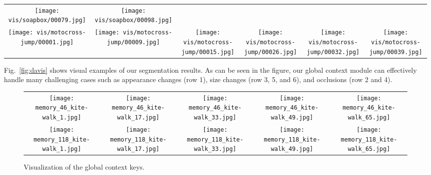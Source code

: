 \documentclass[runningheads]{llncs}
\begin{document}
\begin{figure*}[tb]
\begin{tabular}{cccccc}
        \texttt{[image: vis/soapbox/00079.jpg]} &
        \texttt{[image: vis/soapbox/00098.jpg]} \\
        \texttt{[image: vis/motocross-jump/00001.jpg]} &
        \texttt{[image: vis/motocross-jump/00009.jpg]} &
        \texttt{[image: vis/motocross-jump/00015.jpg]} &
        \texttt{[image: vis/motocross-jump/00026.jpg]} &
        \texttt{[image: vis/motocross-jump/00032.jpg]} &
        \texttt{[image: vis/motocross-jump/00039.jpg]}
    \end{tabular}
    \caption{The visual results of video object segmentation using our global context module.}
    \label{fig:davis}
\end{figure*}

Fig.~\ref{fig:davis} shows visual examples of our segmentation results. As can be seen in the figure, our global context module can effectively handle many challenging cases such as appearance changes (row 1), size changes (row 3, 5, and 6), and occlusions (row 2 and 4).

\begin{figure}[tb]
    \centering
    \setlength{\tabcolsep}{1 pt}
    \begin{tabular}{ccccc}
        \texttt{[image: memory\_46\_kite-walk\_1.jpg]} &
        \texttt{[image: memory\_46\_kite-walk\_17.jpg]} &
        \texttt{[image: memory\_46\_kite-walk\_33.jpg]} &
        \texttt{[image: memory\_46\_kite-walk\_49.jpg]} &
        \texttt{[image: memory\_46\_kite-walk\_65.jpg]} \\
        \texttt{[image: memory\_118\_kite-walk\_1.jpg]} &
        \texttt{[image: memory\_118\_kite-walk\_17.jpg]} &
        \texttt{[image: memory\_118\_kite-walk\_33.jpg]} &
        \texttt{[image: memory\_118\_kite-walk\_49.jpg]} &
        \texttt{[image: memory\_118\_kite-walk\_65.jpg]} \\
    \end{tabular}
    \caption{Visualization of the global context keys.}
    \label{fig:vis}
\end{figure}
\end{document}
